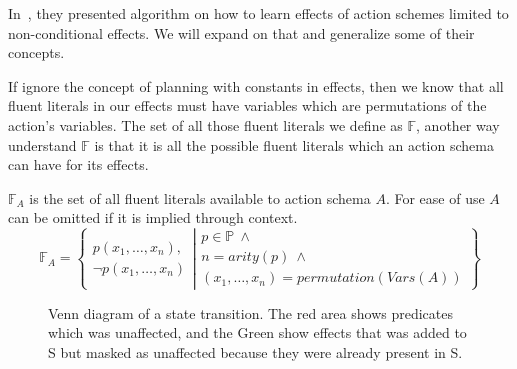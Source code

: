 \documentclass[../Master.tex]{subfiles}
\begin{document}
In~\cite{Walsh2008}, they presented algorithm on how to learn effects of action schemes limited to non-conditional effects. We will expand on that and generalize some of their concepts.

If ignore the concept of planning with constants in effects, then we know that all fluent literals in our effects must have variables which are permutations of the action's variables. The set of all those fluent literals we define as $\mathbb{F}$, another way understand $\mathbb{F}$ is that it is all the possible fluent literals which an action schema can have for its effects.

\begin{definition} 
$\mathbb{F}_A$ is the set of all fluent literals available to action schema $A$. For ease of use $A$ can be omitted if it is implied through context.
	\begin{equation*}
		\mathbb{F}_A = \left\{ 
				\begin{gathered}
					p(x_1,\dots,x_n), \\
					\neg p(x_1,\dots,x_n)
				\end{gathered}
					\left|
				\begin{gathered} p \in \mathbb{P}~\land \\
								n = arity(p)~\land  \\
								(x_1,\dots,x_n) = permutation(Vars(A))
				\end{gathered}				
							\right.\right\}
	\end{equation*}
\end{definition}


\begin{figure}
	\def\firstcircle{(0,0) circle (1.5cm)}
	\def\secondcircle{(0:2cm) circle (1.5cm)}
	\def\thirdcircle{(0:3.8cm) circle (2.9cm)}
	\centering
\caption{\label{fig:nca:venn-of-effects} Venn diagram of a state transition. The red area shows predicates which was unaffected, and the Green show effects that was added to S but masked as unaffected because they were already present in S.}

\end{figure}
\end{document}
